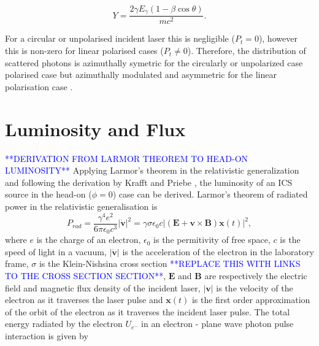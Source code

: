 \documentclass[../main.tex]{subfiles}
\begin{document}
\begin{equation}
Y = \frac{2\gamma E_{\gamma}\left(1-\beta\cos\theta\right)}{mc^{2}}.
\label{eq:cross_section_Y}    
\end{equation}

For a circular or unpolarised incident laser this is negligible ($P_{t}=0$), however this is non-zero for linear polarised cases ($P_{t}\neq0$). Therefore, the distribution of scattered photons is azimuthally symetric for the circularly or unpolarized case polarised case but azimuthally modulated and asymmetric for the linear polarisation case \cite{sun2011theoretical}.  

\section{Luminosity and Flux}
\label{sec:luminosity_and_flux}
\textcolor{blue}{**DERIVATION FROM LARMOR THEOREM TO HEAD-ON LUMINOSITY**}
Applying Larmor's theorem \cite{larmor1897lxiii,purcell1965electricity} in the relativistic generalization \cite{jackson1999classical} and following the derivation by Krafft and Priebe \cite{krafft2010compton}, the luminosity of an ICS source in the head-on ($\phi=0$) case can be derived. Larmor's theorem of radiated power in the relativistic generalisation is 
\begin{equation}
P_{rad} = \frac{\gamma^{4}e^{2}}{6\pi \epsilon_{0}c^{3}}\lvert\mathbf{\dot{v}}\rvert^{2} = \gamma\sigma\epsilon_{0}c\lvert\left(\mathbf{E}+\mathbf{v}\times\mathbf{B}\right)\mathbf{x}\left(t\right)\rvert^{2},
\label{eq:larmor_formula}    
\end{equation}
where $e$ is the charge of an electron,  $\epsilon_{0}$ is the permitivity of free space, $c$ is the speed of light in a vacuum, $\lvert\mathbf{\dot{v}}\rvert$ is the acceleration of the electron in the laboratory frame, $\sigma$ is the Klein-Nishsina cross section \textcolor{blue}{**REPLACE THIS WITH LINKS TO THE CROSS SECTION SECTION**}, $\mathbf{E}$ and $\mathbf{B}$ are respectively the electric field and magnetic flux density of the incident laser, $\lvert\mathbf{v}\rvert$ is the velocity of the electron as it traverses the laser pulse and $\mathbf{x}\left(t\right)$ is the first order approximation of the orbit of the electron as it traverses the incident laser pulse. 
The total energy radiated by the electron $U_{e^{-}}$ in an electron - plane wave photon pulse interaction is given by \cite{krafft2010compton}
\end{document}
